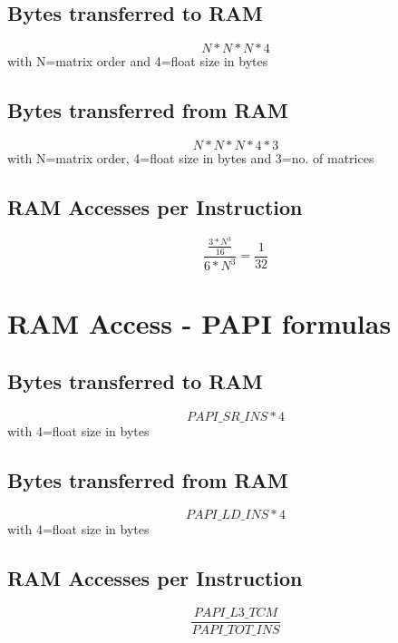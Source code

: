 \documentclass{article}
\begin{document}
\begin{appendices}
\subsection{Bytes transferred to RAM}
\begin{equation}
N*N*N*4\label{bytesToRAM}
\end{equation}
with N=matrix order and 4=float size in bytes

\subsection{Bytes transferred from RAM}
\begin{equation}
N*N*N*4*3\label{bytesFromRAM}
\end{equation}
with N=matrix order, 4=float size in bytes and 3=no. of matrices

\subsection{RAM Accesses per Instruction}
\begin{equation}
\frac{\frac{3*N^3}{16}}{6*N^3} = \frac{1}{32}\label{acessesEq}
\end{equation}

\section{RAM Access - PAPI formulas}
\subsection{Bytes transferred to RAM}
\begin{equation}
PAPI\_SR\_INS*4\label{bytesToRAM_papi}
\end{equation}
with 4=float size in bytes

\subsection{Bytes transferred from RAM}
\begin{equation}
PAPI\_LD\_INS*4\label{bytesFromRAM_papi}
\end{equation}
with 4=float size in bytes

\subsection{RAM Accesses per Instruction}
\begin{equation}
\frac{PAPI\_L3\_TCM}{PAPI\_TOT\_INS} \label{acessesEq_papi}
\end{equation}


\end{appendices}
\end{document}
